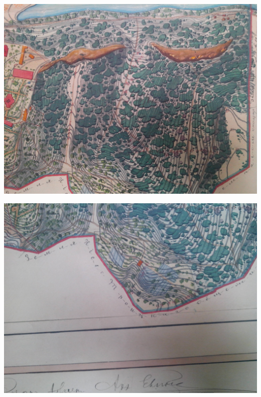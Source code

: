 \begin{center}
\includegraphics[width=\linewidth]{chast-vosp/zver/IMG_20170627_153947.jpg}
\end{center}

\begin{center}
\includegraphics[width=\linewidth]{chast-vosp/zver/IMG_20170627_153952.jpg}
\end{center}

